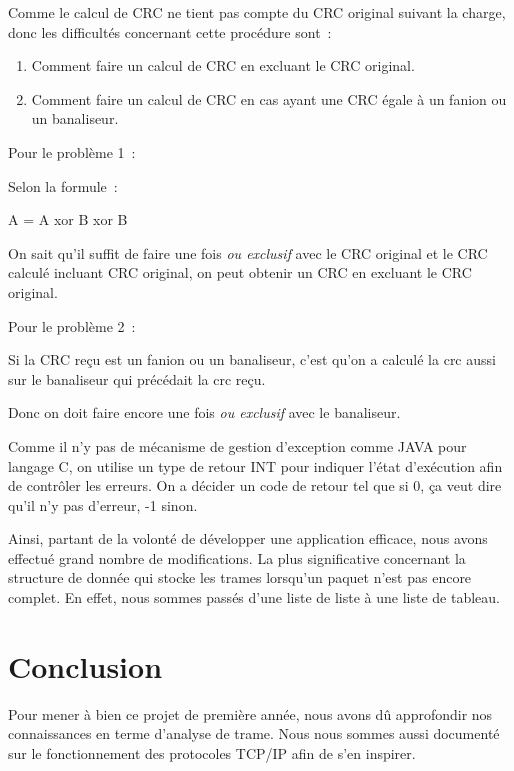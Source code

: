 \documentclass[a4paper,11pt]{article}
\begin{document}
Comme le calcul de CRC ne tient pas compte du CRC original suivant la charge, donc les difficultés concernant cette procédure sont :
\begin{enumerate}
 \item Comment faire un calcul de CRC en excluant le CRC original.
 \item Comment faire un calcul de CRC en cas ayant une CRC égale à un fanion ou un banaliseur.
\end{enumerate}


\vspace{0.5cm}

Pour le problème 1 :

Selon la formule :

A = A xor B xor B

On sait qu'il suffit de faire une fois \textit{ou exclusif} avec le CRC original et le CRC calculé incluant CRC original, on peut obtenir un CRC  en excluant le CRC original.

Pour le problème 2 :

Si la CRC reçu est un fanion ou un banaliseur, c'est qu'on a
 calculé la crc aussi sur le banaliseur qui précédait la crc reçu.

Donc on doit faire encore une fois \textit{ou exclusif} avec le banaliseur.


Comme il n'y pas de mécanisme de gestion d'exception comme JAVA pour langage C, on utilise un type de retour INT pour indiquer l'état d'exécution afin de contrôler les erreurs.
On a décider un code de retour tel que si 0, ça veut dire qu'il n'y pas d'erreur, -1 sinon.

\vspace{0.5cm}

Ainsi, partant de la volonté de développer une application efficace, nous avons effectué grand nombre de modifications. La plus significative concernant la structure de donnée qui stocke les trames lorsqu'un paquet n'est pas encore complet. En effet, nous sommes passés d'une liste de liste à une liste de tableau.

\section{Conclusion}

Pour mener à bien ce projet de première année, nous avons dû approfondir nos connaissances en terme d'analyse de trame. Nous nous sommes aussi documenté sur le fonctionnement des protocoles TCP/IP afin de s'en inspirer.
\end{document}
